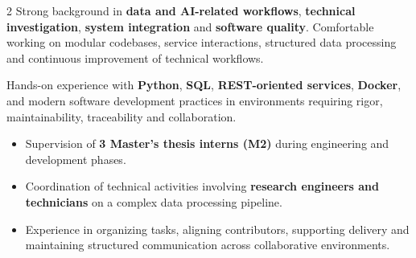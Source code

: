 \documentclass[8pt,a4paper,ragged2e,withhyper]{altacv}
\begin{document}
\begin{paracol}{2}
Strong background in \textbf{data and AI-related workflows}, \textbf{technical investigation}, \textbf{system integration} and \textbf{software quality}. Comfortable working on modular codebases, service interactions, structured data processing and continuous improvement of technical workflows.

Hands-on experience with \textbf{Python}, \textbf{SQL}, \textbf{REST-oriented services}, \textbf{Docker}, and modern software development practices in environments requiring rigor, maintainability, traceability and collaboration.


\begin{itemize}
  \item Supervision of \textbf{3 Master’s thesis interns (M2)} during engineering and development phases.
  \item Coordination of technical activities involving \textbf{research engineers and technicians} on a complex data processing pipeline.
  \item Experience in organizing tasks, aligning contributors, supporting delivery and maintaining structured communication across collaborative environments.
\end{itemize}

{}
\divider

\divider


\medskip

\divider



\divider
{}
\divider
{}



\end{paracol}
\end{document}

